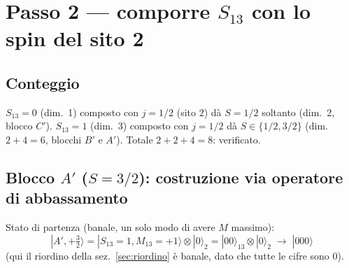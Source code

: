 \documentclass[11pt,a4paper]{article}
\begin{document}
\section{Passo 2 — comporre $S_{13}$ con lo spin del sito 2}

\subsection{Conteggio}

$S_{13}=0$ (dim.\ 1) composto con $j=1/2$ (sito $2$) dà $S=1/2$ soltanto
(dim.\ 2, blocco $C'$). $S_{13}=1$ (dim.\ 3) composto con $j=1/2$ dà $S\in\{1/2,3/2\}$
(dim.\ $2+4=6$, blocchi $B'$ e $A'$). Totale $2+2+4=8$: verificato.

\subsection{Blocco $A'$ ($S=3/2$): costruzione via operatore di abbassamento}

Stato di partenza (banale, un solo modo di avere $M$ massimo):
\begin{equation}
|A',{+}\tfrac32\rangle = |S_{13}{=}1,M_{13}{=}{+}1\rangle\otimes|0\rangle_2 = |00\rangle_{13}\otimes|0\rangle_2 \;\longrightarrow\; |000\rangle
\end{equation}
(qui il riordino della sez.~\ref{sec:riordino} è banale, dato che tutte le
cifre sono $0$).
\end{document}
